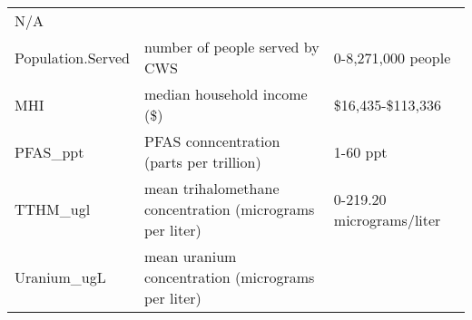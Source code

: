 \documentclass[12pt,]{article}
\begin{document}
\begin{longtable}[]{@{}lll@{}}
\begin{minipage}[t]{0.23\columnwidth}
N/A\strut
\end{minipage}\tabularnewline
\begin{minipage}[t]{0.22\columnwidth}\raggedright
Population.Served\strut
\end{minipage} & \begin{minipage}[t]{0.46\columnwidth}\raggedright
number of people served by CWS\strut
\end{minipage} & \begin{minipage}[t]{0.23\columnwidth}\raggedright
0-8,271,000 people\strut
\end{minipage}\tabularnewline
\begin{minipage}[t]{0.22\columnwidth}\raggedright
MHI\strut
\end{minipage} & \begin{minipage}[t]{0.46\columnwidth}\raggedright
median household income (\$)\strut
\end{minipage} & \begin{minipage}[t]{0.23\columnwidth}\raggedright
\$16,435-\$113,336\strut
\end{minipage}\tabularnewline
\begin{minipage}[t]{0.22\columnwidth}\raggedright
PFAS\_ppt\strut
\end{minipage} & \begin{minipage}[t]{0.46\columnwidth}\raggedright
PFAS conncentration (parts per trillion)\strut
\end{minipage} & \begin{minipage}[t]{0.23\columnwidth}\raggedright
1-60 ppt\strut
\end{minipage}\tabularnewline
\begin{minipage}[t]{0.22\columnwidth}\raggedright
TTHM\_ugl\strut
\end{minipage} & \begin{minipage}[t]{0.46\columnwidth}\raggedright
mean trihalomethane concentration (micrograms per liter)\strut
\end{minipage} & \begin{minipage}[t]{0.23\columnwidth}\raggedright
0-219.20 micrograms/liter\strut
\end{minipage}\tabularnewline
\begin{minipage}[t]{0.22\columnwidth}\raggedright
Uranium\_ugL\strut
\end{minipage} & \begin{minipage}[t]{0.46\columnwidth}\raggedright
mean uranium concentration (micrograms per liter)\strut
\end{minipage} & \begin{minipage}[t]{0.23\columnwidth}\raggedright

\end{minipage}
\end{longtable}
\end{document}
